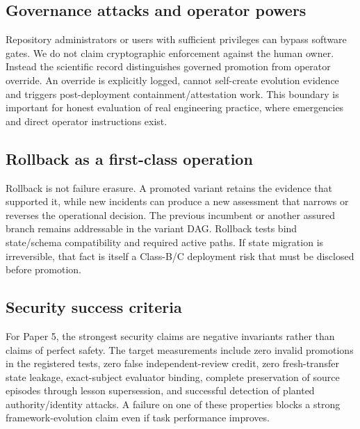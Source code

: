 \subsection{Governance attacks and operator powers}

Repository administrators or users with sufficient privileges can bypass software gates. We do not claim cryptographic enforcement against the human owner. Instead the scientific record distinguishes governed promotion from operator override. An override is explicitly logged, cannot self-create evolution evidence and triggers post-deployment containment/attestation work. This boundary is important for honest evaluation of real engineering practice, where emergencies and direct operator instructions exist.

\subsection{Rollback as a first-class operation}

Rollback is not failure erasure. A promoted variant retains the evidence that supported it, while new incidents can produce a new assessment that narrows or reverses the operational decision. The previous incumbent or another assured branch remains addressable in the variant DAG. Rollback tests bind state/schema compatibility and required active paths. If state migration is irreversible, that fact is itself a Class-B/C deployment risk that must be disclosed before promotion.

\subsection{Security success criteria}

For Paper 5, the strongest security claims are negative invariants rather than claims of perfect safety. The target measurements include zero invalid promotions in the registered tests, zero false independent-review credit, zero fresh-transfer state leakage, exact-subject evaluator binding, complete preservation of source episodes through lesson supersession, and successful detection of planted authority/identity attacks. A failure on one of these properties blocks a strong framework-evolution claim even if task performance improves.